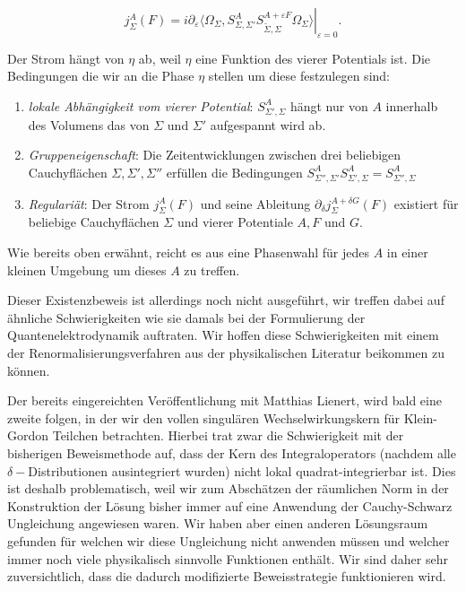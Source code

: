 \documentclass[a4paper,12pt]{article}
\begin{document}
\begin{equation}
j^A_{\Sigma}(F)=i \partial_\varepsilon \left. \langle \Omega_{\Sigma}, S^A_{\Sigma,\Sigma'} S_{\tilde{\Sigma},\Sigma}^{A+\varepsilon F} \Omega_{\Sigma}\rangle \right|_{\varepsilon=0}.
\end{equation}

Der Strom hängt von \(\eta\) ab, weil \(\eta\) eine Funktion des vierer Potentials ist. 
Die Bedingungen die wir an die Phase \(\eta\) stellen um diese festzulegen sind:

\begin{enumerate}
\item \emph{lokale Abhängigkeit vom vierer Potential}: \(S^A_{\Sigma',\Sigma}\) hängt nur von \(A\) innerhalb des Volumens das von \(\Sigma\) und \(\Sigma'\) aufgespannt wird ab.
\item \emph{Gruppeneigenschaft}: Die Zeitentwicklungen zwischen drei beliebigen Cauchyflächen \(\Sigma,\Sigma',\Sigma''\) erfüllen die Bedingungen \(S_{\Sigma'',\Sigma'}^A S_{\Sigma',\Sigma}^A = S_{\Sigma'',\Sigma}^A\)
\item \emph{Regulariät}: Der Strom \(j^A_{\Sigma}(F)\) und seine Ableitung \(\partial_\delta j^{A+\delta G}_{\Sigma}(F)\) existiert für beliebige Cauchyflächen \(\Sigma\) und vierer Potentiale \(A,F\) und \(G\).
\end{enumerate}

Wie bereits oben erwähnt, reicht es aus eine Phasenwahl für jedes \(A\) in einer kleinen Umgebung um dieses \(A\) zu treffen.

Dieser Existenzbeweis ist allerdings noch nicht ausgeführt, wir treffen dabei auf ähnliche Schwierigkeiten wie sie damals bei der
Formulierung der Quantenelektrodynamik auftraten. Wir hoffen diese Schwierigkeiten mit einem der Renormalisierungsverfahren aus
der physikalischen Literatur beikommen zu können.


Der bereits eingereichten Veröffentlichung mit Matthias Lienert, wird bald eine zweite folgen, in der wir den vollen singulären Wechselwirkungskern für
Klein-Gordon Teilchen betrachten. Hierbei trat zwar die Schwierigkeit mit der bisherigen Beweismethode auf, dass der Kern des Integraloperators (nachdem 
alle \(\delta-\)Distributionen ausintegriert wurden) nicht lokal quadrat-integrierbar ist. Dies ist deshalb problematisch, weil wir zum Abschätzen der räumlichen
Norm in der Konstruktion der Lösung bisher immer auf eine Anwendung der Cauchy-Schwarz Ungleichung angewiesen waren. Wir haben aber
einen anderen Lösungsraum gefunden für welchen wir diese Ungleichung nicht anwenden müssen und welcher immer noch viele physikalisch sinnvolle
Funktionen enthält. Wir sind daher sehr zuversichtlich, dass die dadurch modifizierte Beweisstrategie funktionieren wird.
\end{document}
